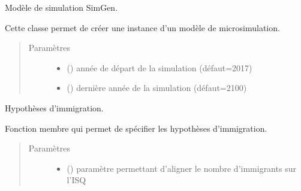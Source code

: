 \documentclass[letterpaper,10pt,french]{sphinxmanual}
\begin{document}
\begin{fulllineitems}
\label{\detokenize{utilisation:id2}}
Modèle de simulation SimGen.

Cette classe permet de créer une instance d’un modèle de microsimulation.
\begin{quote}\begin{description}
\item[{Paramètres}] \leavevmode\begin{itemize}
\item {} 
 () \textendash{} année de départ de la simulation (défaut=2017)

\item {} 
 () \textendash{} dernière année de la simulation (défaut=2100)

\end{itemize}

\end{description}\end{quote}

\begin{fulllineitems}
\label{\detokenize{utilisation:simgen.model.immig_assumptions}}
Hypothèses d’immigration.

Fonction membre qui permet de spécifier les hypothèses d’immigration.
\begin{quote}\begin{description}
\item[{Paramètres}] \leavevmode\begin{itemize}
\item {} 
 () \textendash{} paramètre permettant d’aligner le nombre d’immigrants sur l’ISQ


\end{itemize}
\end{description}
\end{quote}
\end{fulllineitems}
\end{fulllineitems}
\end{document}
